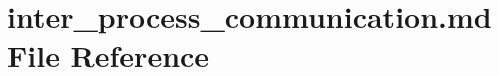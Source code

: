 \hypertarget{inter__process__communication_8md}{\section{inter\-\_\-process\-\_\-communication.\-md File Reference}
\label{inter__process__communication_8md}
}
